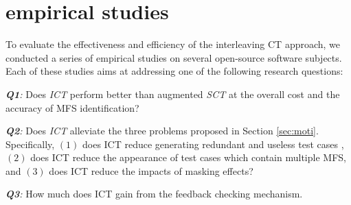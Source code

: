 \documentclass[10pt,journal,compsoc]{IEEEtran}
\begin{document}
%
%

\section{empirical studies}\label{sec:emprical}
To evaluate the effectiveness and efficiency of the interleaving CT approach, we conducted a series of empirical studies on several open-source software subjects. Each of these studies aims at addressing one of the following research questions:

\emph{\textbf{Q1}:} Does \emph{ICT}  perform better than augmented \emph{SCT} at the overall cost and the accuracy of MFS identification?

\emph{\textbf{Q2}:} Does \emph{ICT} alleviate the three problems proposed in Section \ref{sec:moti}. Specifically, $(1)$ does ICT reduce generating redundant and useless test cases , $(2)$ does ICT reduce the appearance of test cases which contain multiple MFS,  and $(3)$ does ICT reduce the impacts of masking effects?

{\color{blue}\emph{\textbf{Q3}:} How much does ICT gain from the feedback checking mechanism.}
\end{document}
